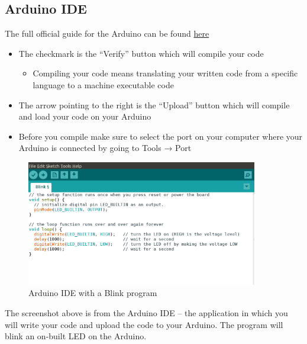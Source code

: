 \documentclass{article}
\begin{document}
\subsection{Arduino IDE} 
The full official guide for the Arduino can be found \href{https://www.arduino.cc/en/Guide/Environment}{here} \\
\begin{itemize}
    \item The checkmark is the “Verify” button which will compile your code
    \begin{itemize}
        \item Compiling your code means translating your written code from a specific language to a machine executable code
    \end{itemize}
    \item The arrow pointing to the right is the “Upload” button which will compile and load your code on your Arduino
    \item Before you compile make sure to select the port on your computer where your Arduino is connected by going to Tools → Port
\end{itemize}
\begin{figure}[ht]
	\center
	\includegraphics[width=0.9\textwidth, keepaspectratio]{images/arduinoide.png}
	\caption{Arduino IDE with a Blink program}
	\label{fig:arduino}
\end{figure}
The screenshot above is from the Arduino IDE -- the application in which you will write your code and upload the code to your Arduino. The program will blink an on-built LED on the Arduino.
\end{document}
